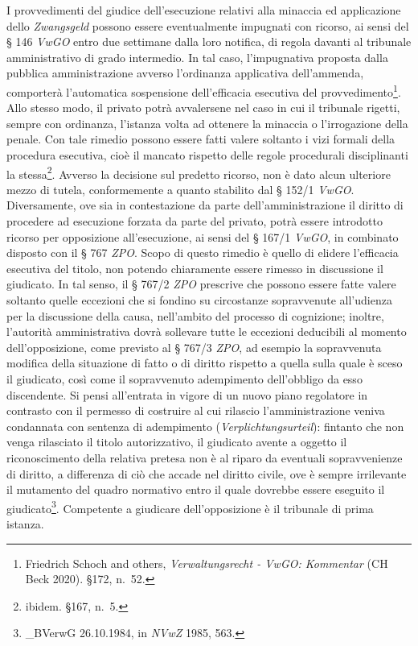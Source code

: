 \documentclass[12pt,it,a4paper,]{report}
\begin{document}
I provvedimenti del giudice dell'esecuzione relativi alla minaccia ed
applicazione dello \emph{Zwangsgeld} possono essere eventualmente
impugnati con ricorso, ai sensi del § 146 \emph{VwGO} entro due
settimane dalla loro notifica, di regola davanti al tribunale
amministrativo di grado intermedio. In tal caso, l'impugnativa proposta
dalla pubblica amministrazione avverso l'ordinanza applicativa
dell'ammenda, comporterà l'automatica sospensione dell'efficacia
esecutiva del provvedimento\footnote{{Friedrich Schoch and others,
  \emph{Verwaltungsrecht - VwGO: Kommentar} ({CH Beck} 2020).} §172,
  n.~52.}. Allo stesso modo, il privato potrà avvalersene nel caso in
cui il tribunale rigetti, sempre con ordinanza, l'istanza volta ad
ottenere la minaccia o l'irrogazione della penale. Con tale rimedio
possono essere fatti valere soltanto i vizi formali della procedura
esecutiva, cioè il mancato rispetto delle regole procedurali
disciplinanti la stessa\footnote{{ibidem.} §167, n.~5.}. Avverso la
decisione sul predetto ricorso, non è dato alcun ulteriore mezzo di
tutela, conformemente a quanto stabilito dal § 152/1 \emph{VwGO}.
Diversamente, ove sia in contestazione da parte dell'amministrazione il
diritto di procedere ad esecuzione forzata da parte del privato, potrà
essere introdotto ricorso per opposizione all'esecuzione, ai sensi del §
167/1 \emph{VwGO}, in combinato disposto con il § 767 \emph{ZPO}. Scopo
di questo rimedio è quello di elidere l'efficacia esecutiva del titolo,
non potendo chiaramente essere rimesso in discussione il giudicato. In
tal senso, il § 767/2 \emph{ZPO} prescrive che possono essere fatte
valere soltanto quelle eccezioni che si fondino su circostanze
sopravvenute all'udienza per la discussione della causa, nell'ambito del
processo di cognizione; inoltre, l'autorità amministrativa dovrà
sollevare tutte le eccezioni deducibili al momento dell'opposizione,
come previsto al § 767/3 \emph{ZPO}, ad esempio la sopravvenuta modifica
della situazione di fatto o di diritto rispetto a quella sulla quale è
sceso il giudicato, così come il sopravvenuto adempimento dell'obbligo
da esso discendente. Si pensi all'entrata in vigore di un nuovo piano
regolatore in contrasto con il permesso di costruire al cui rilascio
l'amministrazione veniva condannata con sentenza di adempimento
(\emph{Verplichtungsurteil}): fintanto che non venga rilasciato il
titolo autorizzativo, il giudicato avente a oggetto il riconoscimento
della relativa pretesa non è al riparo da eventuali sopravvenienze di
diritto, a differenza di ciò che accade nel diritto civile, ove è sempre
irrilevante il mutamento del quadro normativo entro il quale dovrebbe
essere eseguito il giudicato\footnote{\_BVerwG 26.10.1984, in
  \emph{NVwZ} 1985, 563.}. Competente a giudicare dell'opposizione è il
tribunale di prima istanza.
\end{document}

